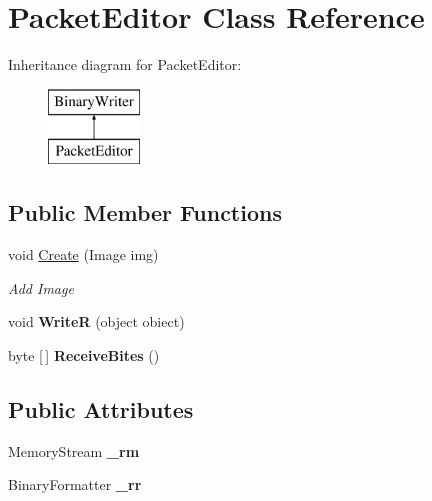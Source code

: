 \hypertarget{class_packet_editor}{}\section{Packet\+Editor Class Reference}
\label{class_packet_editor}
Inheritance diagram for Packet\+Editor\+:\begin{figure}[H]
\begin{center}
\leavevmode
\includegraphics[height=2.000000cm]{class_packet_editor}
\end{center}
\end{figure}
\subsection*{Public Member Functions}
\begin{DoxyCompactItemize}
\item 
void \hyperlink{class_packet_editor_ab9ab39994a95003625b86b1a79851646}{Create} (Image img)
\begin{DoxyCompactList}\small\item\em Add Image \end{DoxyCompactList}\item 
\mbox{\label{class_packet_editor_a697f602681aa1aff2df37432a4b702fc}} 
void {\bfseries WriteR} (object obiect)
\item 
\mbox{\label{class_packet_editor_ac7180d784d970427532a9bb561f3b1b6}} 
byte \mbox{[}$\,$\mbox{]} {\bfseries Receive\+Bites} ()
\end{DoxyCompactItemize}
\subsection*{Public Attributes}
\begin{DoxyCompactItemize}
\item 
\mbox{\label{class_packet_editor_aa7da26d5c70451b80ae34d60408e0399}} 
Memory\+Stream {\bfseries \+\_\+rm}
\item 
\mbox{\label{class_packet_editor_aebd38b898c6226951b6fd5097936e4fa}} 
Binary\+Formatter {\bfseries \+\_\+rr}
\end{DoxyCompactItemize}


